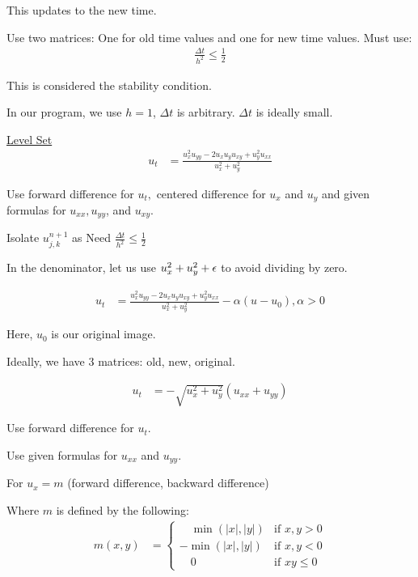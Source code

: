 \documentclass{article}
\begin{document}
This updates to the new time.

Use two matrices: One for old time values and one for new time values. Must use:
%
\begin{align}
  \frac{\Delta t}{h^2} \leq \frac{1}{2}
\end{align}

This is considered the stability condition.

In our program, we use $h = 1$, $\Delta t$ is arbitrary. $\Delta t$ is ideally small.

\underline{Level Set}
%
\begin{align}
  u_t & = \frac{u^2_x u_{yy} - 2 u_x u_y u_{xy} + u^2_yu_{xx}}{u^2_x + u^2_y}
\end{align}

Use forward difference for $u_t,$ centered difference for $u_x$ and $u_y$ and given formulas for $u_{xx}, u_{yy}$, and $u_{xy}$.

Isolate $u^{n + 1}_{j, k}$ as
Need $\frac{\Delta t}{h^2} \leq \frac{1}{2}$

In the denominator, let us use $u^2_x + u^2_y + \epsilon$ to avoid dividing by zero.

%
\begin{align}
  u_t
  & = \frac
  {u^2_x u_{yy} - 2 u_x u_y u_{xy} + u^2_y u_{xx}}
  {u^2_x + u^2_y} - \alpha(u - u_0),  \alpha > 0
\end{align}

Here, $u_0$ is our original image.

Ideally, we have 3 matrices: old, new, original.

%
\begin{align}
  u_t & = -\sqrt{u^2_x + u^2_y} (u_{xx} + u_{yy})
\end{align}

Use forward difference for $u_t$.

Use given formulas for $u_{xx}$ and $u_{yy}$.

For $u_x = m$ (forward difference, backward difference) %

Where $m$ is defined by the following:
%
\begin{align}
  m(x, y) & =
  \begin{cases}
    \quad \min(|x|, |y|)  & \text{if } x, y > 0\\
    -\min(|x|, |y|)       & \text{if } x, y < 0\\
    \quad 0               & \text{if } xy \leq 0
  \end{cases}
\end{align}
\end{document}
